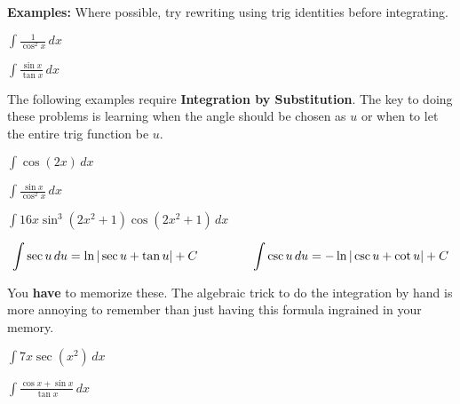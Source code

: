 \documentclass[addpoints, 12pt]{exam}
\begin{document}
\noindent\textbf{Examples:} Where possible, try rewriting using trig identities before integrating.
\begin{questions}
    \question $\displaystyle\int\frac{1}{\cos^2 x}\,dx$
    
    \question $\displaystyle\int\frac{\sin x}{\tan x}\,dx$
    
    
    The following examples require \textbf{Integration by Substitution}. The key to doing these problems is learning when the angle should be chosen as $u$ or when to let the entire trig function be $u$.
    
    \begin{minipage}{0.45\linewidth}
        \question $\displaystyle\int\cos(2x)\,dx$    
    \end{minipage}
    \hfill
    \begin{minipage}{0.45\linewidth}
        \question $\displaystyle\int\frac{\sin x}{\cos^2 x}\,dx$
    \end{minipage}
    
    
    \newpage
    
    \question $\displaystyle\int 16x\sin^3\left(2x^2+1\right)\cos\left(2x^2+1\right) \,dx$
\end{questions}

\begin{tcolorbox}[title= INTEGRAL OF SECANT AND COSECANT,black,sharp corners,colback=white,colbacktitle=white,coltitle=black,boxrule=1pt]

    \[\displaystyle\int\sec u\,du=\ln|\sec u+\tan u|+C \hspace{.6in}\int\csc u\,du=-\ln|\csc u + \cot u|+C\]
    
\end{tcolorbox}
You \textbf{have} to memorize these. The algebraic trick to do the integration by hand is more annoying to remember than just having this formula ingrained in your memory.

\begin{questions}
    \question $\displaystyle \int 7x\sec(x^2)\,dx$
    
    
    \question $\displaystyle \int \frac{\cos x+\sin x}{\tan x}\,dx$
    
\end{questions}
\end{document}
